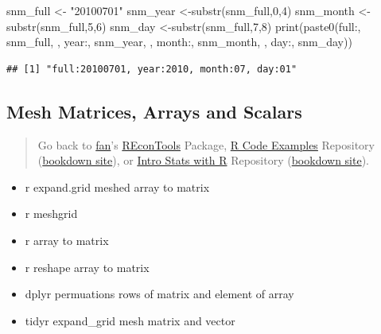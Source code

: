 \documentclass[
]{book}
\newenvironment{Shaded}{\begin{snugshade}}{\end{snugshade}}
\newcommand{\DecValTok}[1]{\textcolor[rgb]{0.00,0.00,0.81}{#1}}
\newcommand{\FunctionTok}[1]{\textcolor[rgb]{0.00,0.00,0.00}{#1}}
\newcommand{\NormalTok}[1]{#1}
\newcommand{\OtherTok}[1]{\textcolor[rgb]{0.56,0.35,0.01}{#1}}
\newcommand{\StringTok}[1]{\textcolor[rgb]{0.31,0.60,0.02}{#1}}
\providecommand{\tightlist}{%
  \setlength{\itemsep}{0pt}\setlength{\parskip}{0pt}}
\begin{document}
\begin{Shaded}
\begin{Highlighting}[]
\NormalTok{snm\_full }\OtherTok{\textless{}{-}} \StringTok{"20100701"}
\NormalTok{snm\_year }\OtherTok{\textless{}{-}}\FunctionTok{substr}\NormalTok{(snm\_full,}\DecValTok{0}\NormalTok{,}\DecValTok{4}\NormalTok{)}
\NormalTok{snm\_month }\OtherTok{\textless{}{-}}\FunctionTok{substr}\NormalTok{(snm\_full,}\DecValTok{5}\NormalTok{,}\DecValTok{6}\NormalTok{)}
\NormalTok{snm\_day }\OtherTok{\textless{}{-}}\FunctionTok{substr}\NormalTok{(snm\_full,}\DecValTok{7}\NormalTok{,}\DecValTok{8}\NormalTok{)}
\FunctionTok{print}\NormalTok{(}\FunctionTok{paste0}\NormalTok{(}\StringTok{\textquotesingle{}full:\textquotesingle{}}\NormalTok{, snm\_full,}
             \StringTok{\textquotesingle{}, year:\textquotesingle{}}\NormalTok{, snm\_year,}
             \StringTok{\textquotesingle{}, month:\textquotesingle{}}\NormalTok{, snm\_month,}
             \StringTok{\textquotesingle{}, day:\textquotesingle{}}\NormalTok{, snm\_day))}
\end{Highlighting}
\end{Shaded}

\begin{verbatim}
## [1] "full:20100701, year:2010, month:07, day:01"
\end{verbatim}

\hypertarget{mesh-matrices-arrays-and-scalars}{%
\subsection{Mesh Matrices, Arrays and Scalars}\label{mesh-matrices-arrays-and-scalars}}

\begin{quote}
Go back to \href{http://fanwangecon.github.io/}{fan}'s \href{https://fanwangecon.github.io/REconTools/}{REconTools} Package, \href{https://fanwangecon.github.io/R4Econ/}{R Code Examples} Repository (\href{https://fanwangecon.github.io/R4Econ/bookdown}{bookdown site}), or \href{https://fanwangecon.github.io/Stat4Econ/}{Intro Stats with R} Repository (\href{https://fanwangecon.github.io/Stat4Econ/bookdown}{bookdown site}).
\end{quote}

\begin{itemize}
\tightlist
\item
  r expand.grid meshed array to matrix
\item
  r meshgrid
\item
  r array to matrix
\item
  r reshape array to matrix
\item
  dplyr permuations rows of matrix and element of array
\item
  tidyr expand\_grid mesh matrix and vector
\end{itemize}
\end{document}
